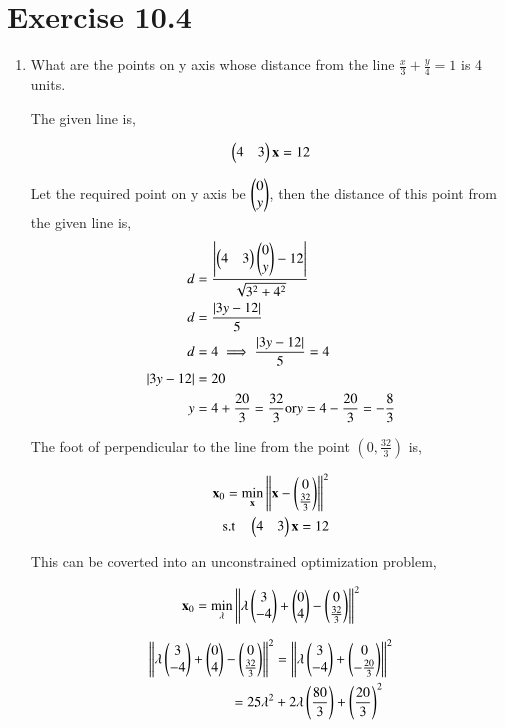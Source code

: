 \documentclass[journal,12pt,twocolumn]{IEEEtran}
\begin{document}
\section{Exercise 10.4}
\begin{enumerate}
	\item What are the points on y axis whose distance from the line $\frac{x}{3}+\frac{y}{4}=1$ is 4 units.
	
		The given line is,

		\begin{align}
			\begin{pmatrix}4 & 3\end{pmatrix}\mathbf{x} = 12
		\end{align}

		Let the required point on y axis be $\begin{pmatrix}0\\y\end{pmatrix}$, then the distance of this point from the given line is,   
		\begin{align}
			d &= \frac{\left\vert\begin{pmatrix}4 & 3\end{pmatrix}\begin{pmatrix}0\\y\end{pmatrix}-12\right\vert}{\sqrt{3^2+4^2}}\\
			d &= \frac{\left\vert3y-12\right\vert}{5}\\
			d &= 4 \implies \frac{\left\vert3y-12\right\vert}{5} = 4\\
			\left\vert3y-12\right\vert &= 20\\
			y &= 4 + \frac{20}{3}=\frac{32}{3} \text{or} y = 4 - \frac{20}{3}=-\frac{8}{3}\\
		\end{align}

The foot of perpendicular to the line from the point $(0,\frac{32}{3})$ is,

		\begin{align}
			\mathbf{x}_0 = \min_{\mathbf{x}} \left\lVert\mathbf{x}-\begin{pmatrix}0\\\frac{32}{3}\end{pmatrix}\right\rVert^2\\
			\text{s.t} \quad \begin{pmatrix}4 & 3\end{pmatrix}\mathbf{x} = 12
		\end{align}

This can be coverted into an unconstrained optimization problem,
	
		\begin{align}
			\mathbf{x}_0 = \min_{\mathbf{\lambda}} \left\lVert\lambda \begin{pmatrix}3\\-4\end{pmatrix}+\begin{pmatrix}0\\4\end{pmatrix}-\begin{pmatrix}0\\\frac{32}{3}\end{pmatrix}\right\rVert^2\\
		\end{align}

		\begin{align}
			\left\lVert\lambda \begin{pmatrix}3\\-4\end{pmatrix}+\begin{pmatrix}0\\4\end{pmatrix}-\begin{pmatrix}0\\\frac{32}{3}\end{pmatrix}\right\rVert^2&= \left\lVert\lambda \begin{pmatrix}3\\-4\end{pmatrix}+\begin{pmatrix}0\\-\frac{20}{3}\end{pmatrix}\right\rVert^2\\
			= 25\lambda^2 &+2\lambda \left(\frac{80}{3}\right)+\left(\frac{20}{3}\right)^2
		\end{align}


\end{enumerate}
\end{document}
